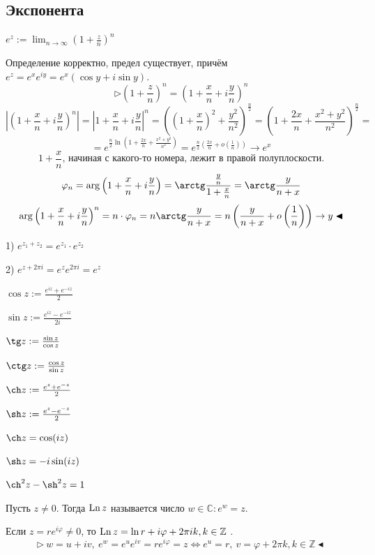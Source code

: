 \subsection{Экспонента}
 $e^z := \lim_{n\to\infty} \left(1+\frac{z}{n}\right)^n$

 Определение корректно, предел существует, причём $e^{z} = e^x e^{iy} = e^x(\cos y + i\sin y)$.
\[\triangleright \left(1+\frac{z}{n}\right)^n = \left(1+\frac{x}{n} + i\frac{y}{n}\right)^n\]
\[\left|\left(1+\frac{x}{n}+i\frac{y}{n}\right)^n\right| = \left|1+\frac{x}{n}+i\frac{y}{n}\right|^n = \left(\left(1+\frac{x}{n}\right)^2+\frac{y^2}{n^2}\right)^\frac{n}{2} = \left(1+\frac{2x}{n} + \frac{x^2+y^2}{n^2}\right)^\frac{n}{2} =\]
\[= e^{\frac{n}{2}\ln\left(1+\frac{2x}{n}+\frac{x^2+y^2}{n^2}\right)} = e^{\frac{n}{2}\left(\frac{2x}{n}+o\left(\frac{1}{n}\right)\right)} \to e^x\]
\[1+\frac{x}{n} \text{, начиная с какого-то номера, лежит в правой полуплоскости.}\]
\[\varphi_n = \arg\left(1+\frac{x}{n} + i\frac{y}{n}\right) = \arctg \frac{\frac{y}{n}}{1+\frac{x}{n}} = \arctg \frac{y}{n+x}\]
\[\arg \left(1+\frac{x}{n}+i\frac{y}{n}\right)^n = n \cdot \varphi_n = n\arctg \frac{y}{n+x} = n\left(\frac{y}{n+x} + o\left(\frac{1}{n}\right)\right) \to y \blacktriangleleft\]

 1) $e^{z_1+z_2} = e^{z_1}\cdot e^{z_2}$

2) $e^{z+2\pi i} = e^z e^{2\pi i} = e^z$

 $\cos z := \frac{e^{iz}+e^{-iz}}{2}$

$\sin z := \frac{e^{iz}-e^{-iz}}{2i}$

$\tg z := \frac{\sin z}{\cos z}$

$\ctg z := \frac{\cos z}{\sin z}$

$\ch z := \frac{e^z+e^{-z}}{2}$

$\sh z := \frac{e^z-e^{-z}}{2}$

 $\ch z = \cos (iz)$

$\sh z = -i\sin(iz)$

$\ch^2 z - \sh^2z = 1$

 Пусть $z \neq 0$. Тогда $\operatorname{Ln} z$ называется число $w \in \mathbb{C}: e^w = z$.

 Если $z = re^{i\varphi}\neq 0$, то $\operatorname{Ln} z = \ln r + i\varphi + 2\pi i k, k \in \mathbb{Z}$ .
\[\triangleright \ w = u+iv, \ e^w = e^u e^{iv} = re^{i\varphi} = z \Leftrightarrow e^u = r, \ v = \varphi +2\pi k, k \in \mathbb{Z} \blacktriangleleft\]

